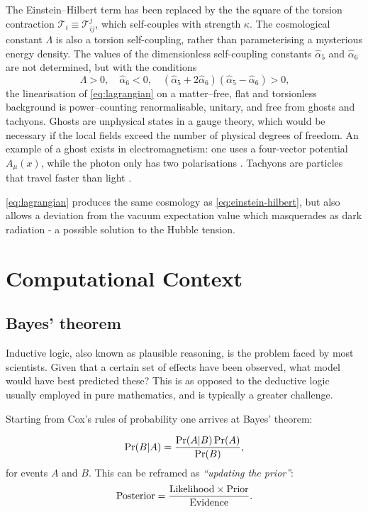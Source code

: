 \documentclass{article}
\begin{document}
The Einstein--Hilbert term has been replaced by the the square of the torsion contraction $\mathcal T_i \equiv \mathcal T^j_{ij}$, which self-couples with strength $\kappa$. The cosmological constant $\Lambda$ is also a torsion self-coupling, rather than parameterising a mysterious energy density. The values of the dimensionless self-coupling constants $\hat\alpha_5$ and $\hat\alpha_6$ are not determined, but with the conditions
\begin{equation}
  \Lambda > 0,\quad \hat\alpha_6<0,\quad (\hat\alpha_5+2\hat\alpha_6)(\hat\alpha_5-\hat\alpha_6) > 0 \textrm{,}
\end{equation}
%
the linearisation of \ref{eq:lagrangian} on a matter--free, flat and torsionless background is power--counting renormalisable, unitary, and free from ghosts and tachyons. Ghosts are unphysical states in a gauge theory, which would be necessary if the local fields exceed the number of physical degrees of freedom. An example of a ghost exists in electromagnetism: one uses a four-vector potential $A_\mu(x)$, while the photon only has two polarisations \cite{Faddeev:2009}. Tachyons are particles that travel faster than light \cite{tachyon}.

\ref{eq:lagrangian} produces the same cosmology as \ref{eq:einstein-hilbert}, but also allows a deviation from the vacuum expectation value which masquerades as dark radiation - a possible solution to the Hubble tension.



\section{Computational Context}
\subsection{Bayes' theorem}
Inductive logic, also known as plausible reasoning, is the problem faced by most scientists. Given that a certain set of effects have been observed, what model would have best predicted these? This is as opposed to the deductive logic usually employed in pure mathematics, and is typically a greater challenge. \cite{skilling}

Starting from Cox's rules of probability one arrives at Bayes' theorem:

\begin{equation}
  \Pr({B|A}) = \frac{\Pr(A|B)\Pr(A)}{\Pr(B)} \textrm,
\end{equation}
%
for events $A$ and $B$. This can be reframed as \textit{``updating the prior''}:
\begin{equation}
  \label{bayes-simple}
  \textrm{Posterior} = \frac{\textrm{Likelihood} \times \textrm{Prior}}{\textrm{Evidence}} \textrm .
\end{equation}
\end{document}
